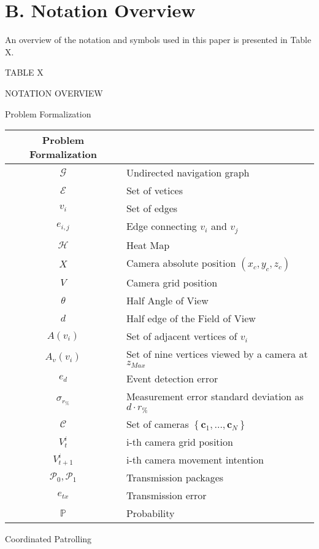 \documentclass[conference]{IEEEtran}
\begin{document}
\section*{B. Notation Overview}
An overview of the notation and symbols used in this paper is presented in Table $\mathrm{X}$.

TABLE X

NOTATION OVERVIEW

Problem Formalization

\begin{center}
\begin{tabular}{cl}
\hline
\multicolumn{1}{c}{Problem Formalization} &  \\
\hline
$\mathcal{G}$ & Undirected navigation graph \\
$\mathcal{E}$ & Set of vetices \\
$v_{i}$ & Set of edges \\
$e_{i, j}$ & Edge connecting $v_{i}$ and $v_{j}$ \\
$\mathcal{H}$ & Heat Map \\
$X$ & Camera absolute position $\left(x_{c}, y_{c}, z_{c}\right)$ \\
$V$ & Camera grid position \\
$\theta$ & Half Angle of View \\
$d$ & Half edge of the Field of View \\
$A\left(v_{i}\right)$ & Set of adjacent vertices of $v_{i}$ \\
$A_{v}\left(v_{i}\right)$ & Set of nine vertices viewed by a camera at $z_{M a x}$ \\
$e_{d}$ & Event detection error \\
$\sigma_{r_{\%}}$ & Measurement error standard deviation as $d \cdot r_{\%}$ \\
$\mathcal{C}$ & Set of cameras $\left\{\mathbf{c}_{1}, \ldots, \mathbf{c}_{N}\right\}$ \\
$V_{t}^{i}$ & i-th camera grid position \\
$V_{t+1}^{i}$ & i-th camera movement intention \\
$\mathcal{P}_{0}, \mathcal{P}_{1}$ & Transmission packages \\
$e_{t x}$ & Transmission error \\
$\mathbb{P}$ & Probability \\
\end{tabular}
\end{center}

Coordinated Patrolling
\end{document}
